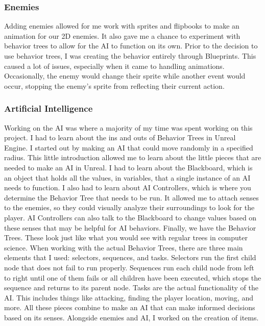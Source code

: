\documentclass{sigchi}
\begin{document}
\subsubsection*{Enemies} Adding enemies allowed for me work with sprites and flipbooks to make an animation for our 2D enemies. It also gave me a chance to experiment with behavior trees to allow for the AI to function on its own. Prior to the decision to use behavior trees, I was creating the behavior entirely through Blueprints. This caused a lot of issues, especially when it came to handling animations. Occasionally, the enemy would change their sprite while another event would occur, stopping the enemy’s sprite from reflecting their current action. 

\subsubsection*{Artificial Intelligence} Working on the AI was where a majority of my time was spent working on this project. I had to learn about the ins and outs of Behavior Trees in Unreal Engine. I started out by making an AI that could move randomly in a specified radius. This little introduction allowed me to learn about the little pieces that are needed to make an AI in Unreal. I had to learn about the Blackboard, which is an object that holds all the values, in variables, that a single instance of an AI needs to function. I also had to learn about AI Controllers, which is where you determine the Behavior Tree that needs to be run. It allowed me to attach senses to the enemies, so they could visually analyze their surroundings to look for the player. AI Controllers can also talk to the Blackboard to change values based on these senses that may be helpful for AI behaviors. Finally, we have the Behavior Trees. These look just like what you would see with regular trees in computer science. When working with the actual Behavior Trees, there are three main elements that I used: selectors, sequences, and tasks. Selectors run the first child node that does not fail to run properly. Sequences run each child node from left to right until one of them fails or all children have been executed, which stops the sequence and returns to its parent node. Tasks are the actual functionality of the AI. This includes things like attacking, finding the player location, moving, and more. All these pieces combine to make an AI that can make informed decisions based on its senses. Alongside enemies and AI, I worked on the creation of items. 
\end{document}
